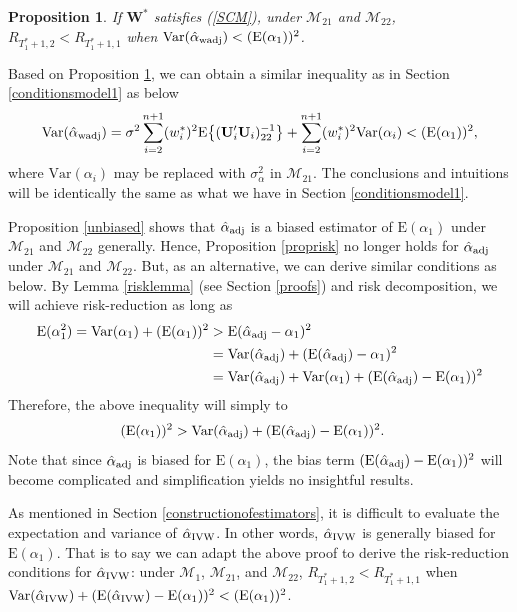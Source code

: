 \documentclass[11pt]{article}
\def\mbf#1{\mathbf{#1}} %
\def\mrm#1{\mathrm{#1}} %
\def\mc#1{\mathcal{#1}} %
\def\E#1{\mathrm{E}(#1)} %
\def\var#1{\mathrm{Var}(#1)} %
\newtheorem{prop}{Proposition}
\theoremstyle{definition}
\begin{document}
\begin{prop}
\label{propriskwadj2} If $\mbf{W}^*$ satisfies (\ref{SCM}), under $\mc{M}_{21}$ and $\mc{M}_{22}$, $R_{T_1^*+1,2}<R_{T_1^*+1,1}$ when $\var{\hat{\alpha}_{\rm wadj}}<(\E{\alpha_1})^2$. 
\end{prop}

Based on Proposition \ref{propriskwadj2}, we can obtain a similar inequality as in Section \ref{conditionsmodel1} as below
\begin{align*}
\var{\hat{\alpha}_{\rm wadj}}
 = \sigma^2\sum_{i=2}^{n+1}(w_i^*)^2\mrm{E}\big\{(\mbf{U}'_i\mbf{U}_i)^{-1}_{22}\big\} + \sum_{i=2}^{n+1} (w_i^*)^2 \var{\alpha_i} < (\E{\alpha_1})^2,
\end{align*}
where $\var{\alpha_i}$ may be replaced with $\sigma^2_{\alpha}$ in $\mc{M}_{21}$. The conclusions and intuitions will be identically the same as what we have in Section \ref{conditionsmodel1}. 


Proposition \ref{unbiased} shows that $\hat{\alpha}_{\rm adj}$ is a biased estimator of $\E{\alpha_1}$ under $\mc{M}_{21}$ and $\mc{M}_{22}$ generally. Hence, Proposition \ref{proprisk} no longer  holds for $\hat{\alpha}_{\rm adj}$ under $\mc{M}_{21}$ and $\mc{M}_{22}$. But, as an alternative, we can derive similar conditions as below. By Lemma \ref{risklemma} (see Section \ref{proofs}) and risk decomposition, we will achieve risk-reduction as long as
\begin{align*}
 \E{\alpha_1^2}= \var{\alpha_1}+(\E{\alpha_1})^2
 &>\E{\hat{\alpha}_{\rm adj}-\alpha_1}^2\\
  &=\var{\hat{\alpha}_{\rm adj}} +  (\E{\hat{\alpha}_{\rm adj}}-\alpha_1)^2 \\
  &=\var{\hat{\alpha}_{\rm adj}} +  \var{\alpha_1} + (\E{\hat{\alpha}_{\rm adj}}-\E{\alpha_1})^2
\end{align*}
Therefore, the above inequality will simply to 
\begin{align*}
 (\E{\alpha_1})^2
 &>\var{\hat{\alpha}_{\rm adj}}+ (\E{\hat{\alpha}_{\rm adj}}-\E{\alpha_1})^2.
\end{align*}
Note that since $\hat{\alpha}_{\rm adj}$ is biased for $\E{\alpha_1}$, the bias term $(\E{\hat{\alpha}_{\rm adj}}-\E{\alpha_1})^2$ will become complicated and  simplification yields no insightful results. 

As mentioned in Section \ref{constructionofestimators}, it is difficult to evaluate the expectation and variance of $\hat{\alpha}_{\rm IVW}$. In other words, $\hat{\alpha}_{\rm IVW}$ is generally biased for $\E{\alpha_1}$. That is to say we can adapt the above proof to derive the risk-reduction conditions for $\hat{\alpha}_{\rm IVW}$: under $\mc{M}_{1}$, $\mc{M}_{21}$, and $\mc{M}_{22}$, $R_{T_1^*+1,2}<R_{T_1^*+1,1}$ when $\var{\hat{\alpha}_{\rm IVW}} +(\E{\hat{\alpha}_{\rm IVW}}-\E{\alpha_1})^2<(\E{\alpha_1})^2$.
\end{document}
